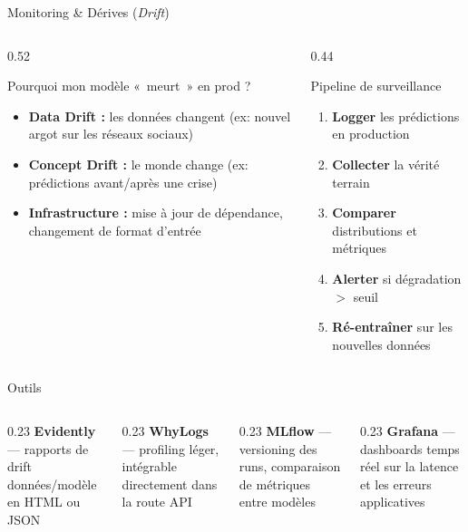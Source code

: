 \documentclass[aspectratio=169, 10pt]{beamer}
\begin{document}
\begin{frame}{Monitoring \& Dérives (\textit{Drift})}
  \begin{columns}[T]
    \begin{column}{0.52\textwidth}
      \begin{alertblock}{Pourquoi mon modèle «~meurt~» en prod ?}
        \begin{itemize}
          \item \textbf{Data Drift :} les données changent
                (ex: nouvel argot sur les réseaux sociaux)
          \item \textbf{Concept Drift :} le monde change
                (ex: prédictions avant/après une crise)
          \item \textbf{Infrastructure :} mise à jour de dépendance,
                changement de format d'entrée
        \end{itemize}
      \end{alertblock}
    \end{column}
    \begin{column}{0.44\textwidth}
      \begin{exampleblock}{Pipeline de surveillance}
        \begin{enumerate}
          \item \textbf{Logger} les prédictions en production
          \item \textbf{Collecter} la vérité terrain
          \item \textbf{Comparer} distributions et métriques
          \item \textbf{Alerter} si dégradation $>$ seuil
          \item \textbf{Ré-entraîner} sur les nouvelles données
        \end{enumerate}
      \end{exampleblock}
    \end{column}
  \end{columns}
  \vspace{4pt}
  \begin{block}{Outils}
    \begin{columns}[T]
      \begin{column}{0.23\textwidth}
        \textbf{Evidently} --- rapports de drift données/modèle en HTML ou JSON
      \end{column}
      \begin{column}{0.23\textwidth}
        \textbf{WhyLogs} --- profiling léger, intégrable directement dans la route API
      \end{column}
      \begin{column}{0.23\textwidth}
        \textbf{MLflow} --- versioning des runs, comparaison de métriques entre modèles
      \end{column}
      \begin{column}{0.23\textwidth}
        \textbf{Grafana} --- dashboards temps réel sur la latence et les erreurs applicatives
      \end{column}
    \end{columns}
  \end{block}
\end{frame}
\end{document}
